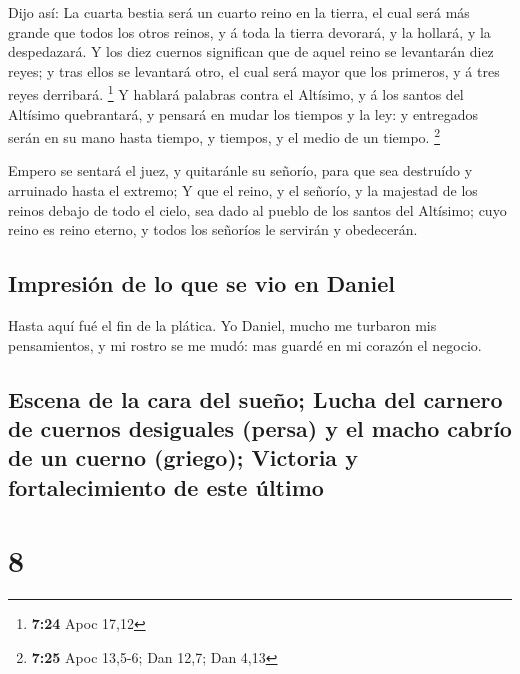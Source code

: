  Dijo así: La cuarta bestia será un cuarto reino en la
tierra, el cual será más grande que todos los otros reinos, y á toda la
tierra devorará, y la hollará, y la despedazará.  Y los
diez cuernos significan que de aquel reino se levantarán diez reyes; y
tras ellos se levantará otro, el cual será mayor que los primeros, y á
tres reyes derribará. \footnote{\textbf{7:24} Apoc 17,12}
 Y hablará palabras contra el Altísimo, y á los santos
del Altísimo quebrantará, y pensará en mudar los tiempos y la ley: y
entregados serán en su mano hasta tiempo, y tiempos, y el medio de un
tiempo. \footnote{\textbf{7:25} Apoc 13,5-6; Dan 12,7; Dan 4,13}

 Empero se sentará el juez, y quitaránle su señorío, para
que sea destruído y arruinado hasta el extremo;  Y que el
reino, y el señorío, y la majestad de los reinos debajo de todo el
cielo, sea dado al pueblo de los santos del Altísimo; cuyo reino es
reino eterno, y todos los señoríos le servirán y obedecerán.

\hypertarget{impresiuxf3n-de-lo-que-se-vio-en-daniel}{%
\subsection{Impresión de lo que se vio en
Daniel}\label{impresiuxf3n-de-lo-que-se-vio-en-daniel}}

 Hasta aquí fué el fin de la plática. Yo Daniel, mucho me
turbaron mis pensamientos, y mi rostro se me mudó: mas guardé en mi
corazón el negocio.

\hypertarget{escena-de-la-cara-del-sueuxf1o-lucha-del-carnero-de-cuernos-desiguales-persa-y-el-macho-cabruxedo-de-un-cuerno-griego-victoria-y-fortalecimiento-de-este-uxfaltimo}{%
\subsection{Escena de la cara del sueño; Lucha del carnero de cuernos
desiguales (persa) y el macho cabrío de un cuerno (griego); Victoria y
fortalecimiento de este
último}\label{escena-de-la-cara-del-sueuxf1o-lucha-del-carnero-de-cuernos-desiguales-persa-y-el-macho-cabruxedo-de-un-cuerno-griego-victoria-y-fortalecimiento-de-este-uxfaltimo}}

\hypertarget{section-7}{%
\section{8}\label{section-7}}

